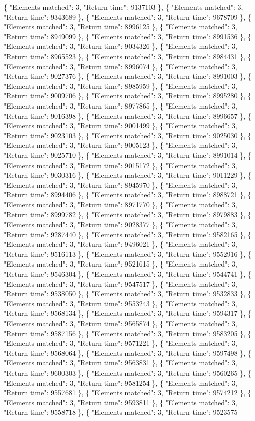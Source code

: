 \{ "Elements matched": 3, "Return time": 9137103 \}, \{ "Elements matched": 3, "Return time": 9343689 \}, \{ "Elements matched": 3, "Return time": 9678709 \}, \{ "Elements matched": 3, "Return time": 8996125 \}, \{ "Elements matched": 3, "Return time": 8949099 \}, \{ "Elements matched": 3, "Return time": 8991536 \}, \{ "Elements matched": 3, "Return time": 9034326 \}, \{ "Elements matched": 3, "Return time": 8965523 \}, \{ "Elements matched": 3, "Return time": 8984431 \}, \{ "Elements matched": 3, "Return time": 8996074 \}, \{ "Elements matched": 3, "Return time": 9027376 \}, \{ "Elements matched": 3, "Return time": 8991003 \}, \{ "Elements matched": 3, "Return time": 8985959 \}, \{ "Elements matched": 3, "Return time": 9009706 \}, \{ "Elements matched": 3, "Return time": 8995280 \}, \{ "Elements matched": 3, "Return time": 8977865 \}, \{ "Elements matched": 3, "Return time": 9016398 \}, \{ "Elements matched": 3, "Return time": 8996657 \}, \{ "Elements matched": 3, "Return time": 9001499 \}, \{ "Elements matched": 3, "Return time": 9023103 \}, \{ "Elements matched": 3, "Return time": 9025030 \}, \{ "Elements matched": 3, "Return time": 9005123 \}, \{ "Elements matched": 3, "Return time": 9025710 \}, \{ "Elements matched": 3, "Return time": 8991014 \}, \{ "Elements matched": 3, "Return time": 9015172 \}, \{ "Elements matched": 3, "Return time": 9030316 \}, \{ "Elements matched": 3, "Return time": 9011229 \}, \{ "Elements matched": 3, "Return time": 8945970 \}, \{ "Elements matched": 3, "Return time": 8994406 \}, \{ "Elements matched": 3, "Return time": 8988721 \}, \{ "Elements matched": 3, "Return time": 8971770 \}, \{ "Elements matched": 3, "Return time": 8999782 \}, \{ "Elements matched": 3, "Return time": 8979883 \}, \{ "Elements matched": 3, "Return time": 9028377 \}, \{ "Elements matched": 3, "Return time": 9287440 \}, \{ "Elements matched": 3, "Return time": 9582165 \}, \{ "Elements matched": 3, "Return time": 9496021 \}, \{ "Elements matched": 3, "Return time": 9516113 \}, \{ "Elements matched": 3, "Return time": 9552916 \}, \{ "Elements matched": 3, "Return time": 9521615 \}, \{ "Elements matched": 3, "Return time": 9546304 \}, \{ "Elements matched": 3, "Return time": 9544741 \}, \{ "Elements matched": 3, "Return time": 9547517 \}, \{ "Elements matched": 3, "Return time": 9538050 \}, \{ "Elements matched": 3, "Return time": 9532833 \}, \{ "Elements matched": 3, "Return time": 9553243 \}, \{ "Elements matched": 3, "Return time": 9568134 \}, \{ "Elements matched": 3, "Return time": 9594317 \}, \{ "Elements matched": 3, "Return time": 9565874 \}, \{ "Elements matched": 3, "Return time": 9587156 \}, \{ "Elements matched": 3, "Return time": 9583205 \}, \{ "Elements matched": 3, "Return time": 9571221 \}, \{ "Elements matched": 3, "Return time": 9568064 \}, \{ "Elements matched": 3, "Return time": 9597498 \}, \{ "Elements matched": 3, "Return time": 9563831 \}, \{ "Elements matched": 3, "Return time": 9600303 \}, \{ "Elements matched": 3, "Return time": 9560265 \}, \{ "Elements matched": 3, "Return time": 9581254 \}, \{ "Elements matched": 3, "Return time": 9557681 \}, \{ "Elements matched": 3, "Return time": 9574212 \}, \{ "Elements matched": 3, "Return time": 9593811 \}, \{ "Elements matched": 3, "Return time": 9558718 \}, \{ "Elements matched": 3, "Return time": 9523575 